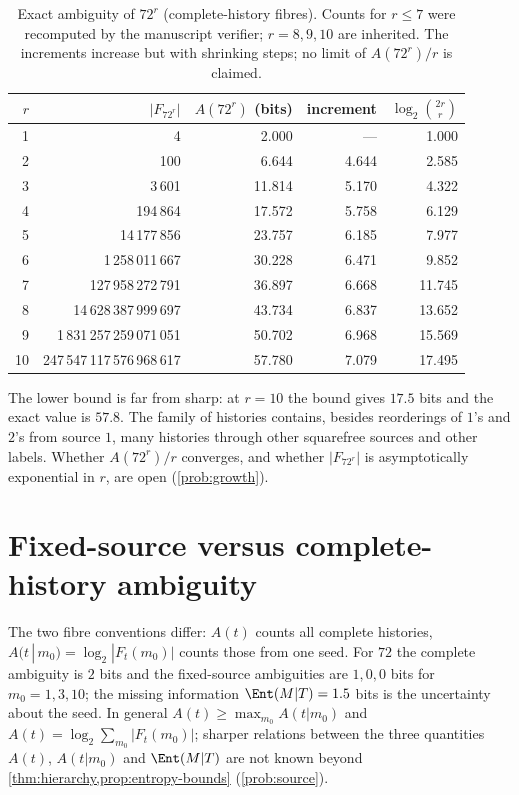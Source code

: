 \begin{table}[ht]\centering\small
\begin{tabular}{rrrrr}\toprule
$r$ & $|F_{72^r}|$ & $A(72^r)$ (bits) & increment & $\log_2\binom{2r}{r}$\\\midrule
1 & 4 & 2.000 & --- & 1.000\\
2 & 100 & 6.644 & 4.644 & 2.585\\
3 & 3\,601 & 11.814 & 5.170 & 4.322\\
4 & 194\,864 & 17.572 & 5.758 & 6.129\\
5 & 14\,177\,856 & 23.757 & 6.185 & 7.977\\
6 & 1\,258\,011\,667 & 30.228 & 6.471 & 9.852\\
7 & 127\,958\,272\,791 & 36.897 & 6.668 & 11.745\\
8 & 14\,628\,387\,999\,697 & 43.734 & 6.837 & 13.652\\
9 & 1\,831\,257\,259\,071\,051 & 50.702 & 6.968 & 15.569\\
10 & 247\,547\,117\,576\,968\,617 & 57.780 & 7.079 & 17.495\\\bottomrule
\end{tabular}
\caption{Exact ambiguity of $72^r$ (complete-history fibres). Counts for $r\le7$ were recomputed by the manuscript verifier; $r=8,9,10$ are inherited. The increments increase but with shrinking steps; no limit of $A(72^r)/r$ is claimed.}\label{tab:72r}
\end{table}
The lower bound is far from sharp: at $r=10$ the bound gives $17.5$ bits and the exact value is $57.8$. The family of histories contains, besides reorderings of $1$'s and $2$'s from source $1$, many histories through other squarefree sources and other labels. Whether $A(72^r)/r$ converges, and whether $|F_{72^r}|$ is asymptotically exponential in $r$, are open (\cref{prob:growth}).

\section{Fixed-source versus complete-history ambiguity}
The two fibre conventions differ: $A(t)$ counts all complete histories, $A(t\,|\,m_0)=\log_2|F_t(m_0)|$ counts those from one seed. For $72$ the complete ambiguity is $2$ bits and the fixed-source ambiguities are $1,0,0$ bits for $m_0=1,3,10$; the missing information $\Ent(M|T)=1.5$ bits is the uncertainty about the seed. In general $A(t)\ge\max_{m_0}A(t|m_0)$ and $A(t)=\log_2\sum_{m_0}|F_t(m_0)|$; sharper relations between the three quantities $A(t)$, $A(t|m_0)$ and $\Ent(M|T)$ are not known beyond \cref{thm:hierarchy,prop:entropy-bounds} (\cref{prob:source}).
